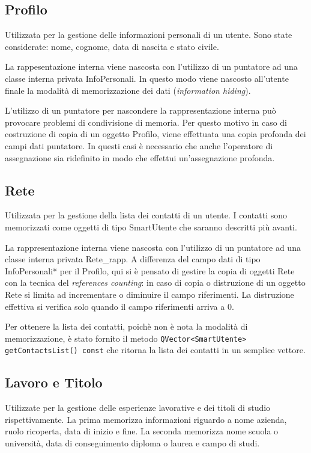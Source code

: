 \documentclass[a4paper,10pt]{article}
\begin{document}
\subsection*{Profilo}
Utilizzata per la gestione delle informazioni personali di un utente. Sono state considerate: nome, cognome, data di nascita e stato civile. 

La rappesentazione interna viene nascosta con l'utilizzo di un puntatore ad una classe interna privata InfoPersonali. In questo modo viene nascosto all'utente finale la modalità di memorizzazione dei dati (\textit{information hiding}).

L'utilizzo di un puntatore per nascondere la rappresentazione interna può provocare problemi di condivisione di memoria. Per questo motivo in caso di costruzione di copia di un oggetto Profilo, viene effettuata una copia profonda dei campi dati puntatore. In questi casi è necessario che anche l'operatore di assegnazione sia ridefinito in modo che effettui un'assegnazione profonda.

\subsection*{Rete}
Utilizzata per la gestione della lista dei contatti di un utente. I contatti sono memorizzati come oggetti di tipo SmartUtente che saranno descritti più avanti.

La rappresentazione interna viene nascosta con l'utilizzo di un puntatore ad una classe interna privata Rete\_rapp. A differenza del campo dati di tipo InfoPersonali* per il Profilo, qui si è pensato di gestire la copia di oggetti Rete con la tecnica del \textit{references counting}: in caso di copia o distruzione di un oggetto Rete si limita ad incrementare o diminuire il campo riferimenti. La distruzione effettiva si verifica solo quando il campo riferimenti arriva a 0.

Per ottenere la lista dei contatti, poichè non è nota la modalità di memorizzazione, è stato fornito il metodo \texttt{QVector<SmartUtente> getContactsList() const} che ritorna la lista dei contatti in un semplice vettore.

\subsection*{Lavoro e Titolo}
Utilizzate per la gestione delle esperienze lavorative e dei titoli di studio rispettivamente. La prima memorizza informazioni riguardo a nome azienda, ruolo ricoperta, data di inizio e fine. La seconda memorizza nome scuola o università, data di conseguimento diploma o laurea e campo di studi.
\end{document}
